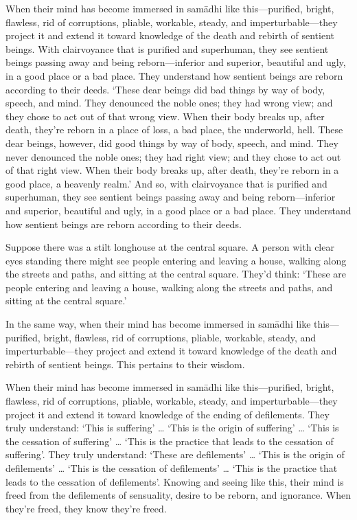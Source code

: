 \documentclass[12pt,openany]{book}%
\begin{document}
When their mind has become immersed in \textsanskrit{samādhi} like this—purified, bright, flawless, rid of corruptions, pliable, workable, steady, and imperturbable—they project it and extend it toward knowledge of the death and rebirth of sentient beings. With clairvoyance that is purified and superhuman, they see sentient beings passing away and being reborn—inferior and superior, beautiful and ugly, in a good place or a bad place. They understand how sentient beings are reborn according to their deeds. ‘These dear beings did bad things by way of body, speech, and mind. They denounced the noble ones; they had wrong view; and they chose to act out of that wrong view. When their body breaks up, after death, they’re reborn in a place of loss, a bad place, the underworld, hell. These dear beings, however, did good things by way of body, speech, and mind. They never denounced the noble ones; they had right view; and they chose to act out of that right view. When their body breaks up, after death, they’re reborn in a good place, a heavenly realm.’ And so, with clairvoyance that is purified and superhuman, they see sentient beings passing away and being reborn—inferior and superior, beautiful and ugly, in a good place or a bad place. They understand how sentient beings are reborn according to their deeds. 

Suppose there was a stilt longhouse at the central square. A person with clear eyes standing there might see people entering and leaving a house, walking along the streets and paths, and sitting at the central square. They’d think: ‘These are people entering and leaving a house, walking along the streets and paths, and sitting at the central square.’ 

In the same way, when their mind has become immersed in \textsanskrit{samādhi} like this—purified, bright, flawless, rid of corruptions, pliable, workable, steady, and imperturbable—they project and extend it toward knowledge of the death and rebirth of sentient beings. This pertains to their wisdom. 

When their mind has become immersed in \textsanskrit{samādhi} like this—purified, bright, flawless, rid of corruptions, pliable, workable, steady, and imperturbable—they project it and extend it toward knowledge of the ending of defilements. They truly understand: ‘This is suffering’ … ‘This is the origin of suffering’ … ‘This is the cessation of suffering’ … ‘This is the practice that leads to the cessation of suffering’. They truly understand: ‘These are defilements’ … ‘This is the origin of defilements’ … ‘This is the cessation of defilements’ … ‘This is the practice that leads to the cessation of defilements’. Knowing and seeing like this, their mind is freed from the defilements of sensuality, desire to be reborn, and ignorance. When they’re freed, they know they’re freed. 
\end{document}
